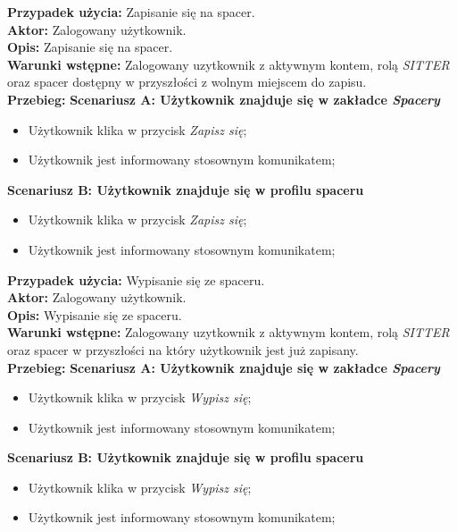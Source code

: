 \noindent
\textbf{Przypadek użycia:} Zapisanie się na spacer. \\
\textbf{Aktor:} Zalogowany użytkownik. \\
\textbf{Opis:} Zapisanie się na spacer. \\
\textbf{Warunki wstępne:} Zalogowany uzytkownik z aktywnym kontem, rolą \textit{SITTER} oraz spacer dostępny w przyszłości z wolnym miejscem do zapisu. \\
\textbf{Przebieg:}
\textbf{Scenariusz A: Użytkownik znajduje się w zakładce \textit{Spacery}}
\begin{itemize}[leftmargin=1cm]
    \item Użytkownik klika w przycisk \textit{Zapisz się};
    \item Użytkownik jest informowany stosownym komunikatem;
\end{itemize}
\textbf{Scenariusz B: Użytkownik znajduje się w profilu spaceru}
\begin{itemize}[leftmargin=1cm]
    \item Użytkownik klika w przycisk \textit{Zapisz się};
    \item Użytkownik jest informowany stosownym komunikatem;
\end{itemize}

\noindent
\textbf{Przypadek użycia:} Wypisanie się ze spaceru. \\
\textbf{Aktor:} Zalogowany użytkownik. \\
\textbf{Opis:} Wypisanie się ze spaceru. \\
\textbf{Warunki wstępne:} Zalogowany uzytkownik z aktywnym kontem, rolą \textit{SITTER} oraz spacer w przyszłości na który użytkownik jest już zapisany. \\
\textbf{Przebieg:}
\textbf{Scenariusz A: Użytkownik znajduje się w zakładce \textit{Spacery}}
\begin{itemize}[leftmargin=1cm]
    \item Użytkownik klika w przycisk \textit{Wypisz się};
    \item Użytkownik jest informowany stosownym komunikatem;
\end{itemize}
\textbf{Scenariusz B: Użytkownik znajduje się w profilu spaceru}
\begin{itemize}[leftmargin=1cm]
    \item Użytkownik klika w przycisk \textit{Wypisz się};
    \item Użytkownik jest informowany stosownym komunikatem;
\end{itemize}

